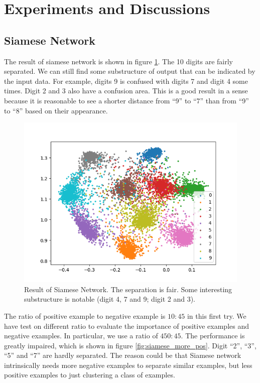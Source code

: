 \documentclass[10pt,twocolumn,letterpaper]{article}
\begin{document}
	\section{Experiments and Discussions \label{sec:Res}}
		\subsection{Siamese Network}
			The result of siamese network is shown in figure \ref{fig:siamese}. The 10 digits are fairly separated. We can still find some substructure of output that can be indicated by the input data. For example, digits 9 is confused with digits 7 and digit 4 some times. Digit 2 and 3 also have a confusion area. This is a good result in a sense because it is reasonable to see a shorter distance from ``9'' to ``7'' than from ``9'' to ``8'' based on their appearance.
			\begin{figure}[htbp]
				\begin{center}
					\includegraphics[width=0.9\linewidth]{siamese}
				\end{center}
				\caption{Result of Siamese Network. The separation is fair. Some interesting substructure is notable (digit 4, 7 and 9; digit 2 and 3).\label{fig:siamese}}
			\end{figure}
			
			The ratio of positive example to negative example is $10:45$ in this first try. We have test on different ratio to evaluate the importance of positive examples and negative examples. In particular, we use a ratio of $450:45$. The performance is greatly impaired, which is shown in figure \ref{fig:siamese_more_pos}. Digit ``2'', ``3'', ``5'' and ``7'' are hardly separated. The reason could be that Siamese network intrinsically needs more negative examples to separate similar examples, but less positive examples to just clustering a class of examples. 
			
\end{document}
